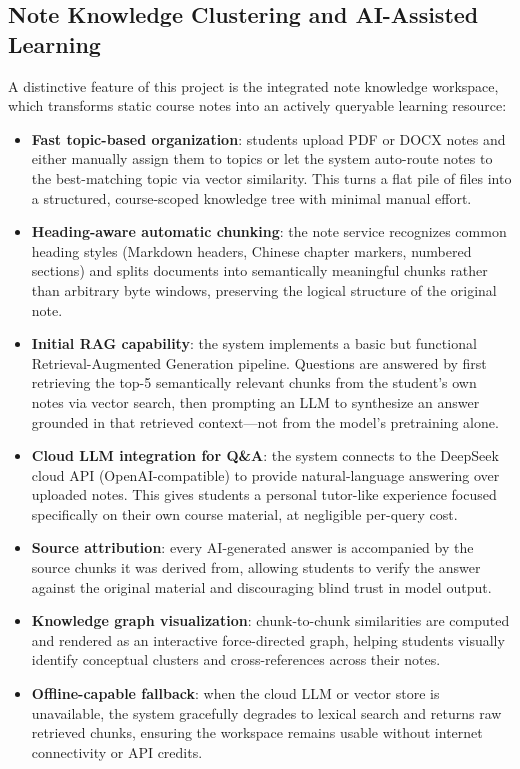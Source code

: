\documentclass[12pt,a4paper]{article}
\begin{document}
\subsection{Note Knowledge Clustering and AI-Assisted Learning}

A distinctive feature of this project is the integrated note knowledge workspace, which transforms static course notes into an actively queryable learning resource:

\begin{itemize}[nosep]
    \item \textbf{Fast topic-based organization}: students upload PDF or DOCX notes and either manually assign them to topics or let the system auto-route notes to the best-matching topic via vector similarity. This turns a flat pile of files into a structured, course-scoped knowledge tree with minimal manual effort.
    \item \textbf{Heading-aware automatic chunking}: the note service recognizes common heading styles (Markdown headers, Chinese chapter markers, numbered sections) and splits documents into semantically meaningful chunks rather than arbitrary byte windows, preserving the logical structure of the original note.
    \item \textbf{Initial RAG capability}: the system implements a basic but functional Retrieval-Augmented Generation pipeline. Questions are answered by first retrieving the top-5 semantically relevant chunks from the student's own notes via vector search, then prompting an LLM to synthesize an answer grounded in that retrieved context---not from the model's pretraining alone.
    \item \textbf{Cloud LLM integration for Q\&A}: the system connects to the DeepSeek cloud API (OpenAI-compatible) to provide natural-language answering over uploaded notes. This gives students a personal tutor-like experience focused specifically on their own course material, at negligible per-query cost.
    \item \textbf{Source attribution}: every AI-generated answer is accompanied by the source chunks it was derived from, allowing students to verify the answer against the original material and discouraging blind trust in model output.
    \item \textbf{Knowledge graph visualization}: chunk-to-chunk similarities are computed and rendered as an interactive force-directed graph, helping students visually identify conceptual clusters and cross-references across their notes.
    \item \textbf{Offline-capable fallback}: when the cloud LLM or vector store is unavailable, the system gracefully degrades to lexical search and returns raw retrieved chunks, ensuring the workspace remains usable without internet connectivity or API credits.
\end{itemize}
\end{document}
